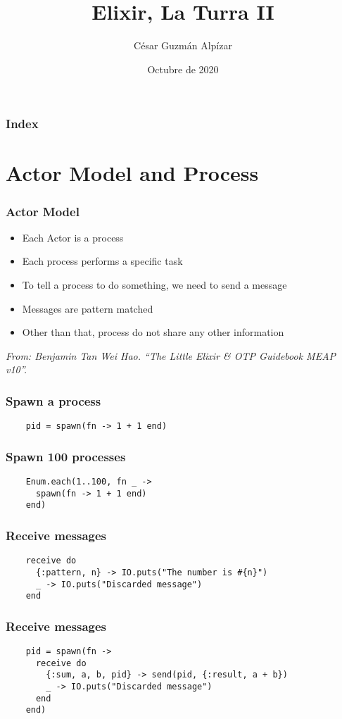\documentclass{beamer}
\title{Elixir, La Turra II}
\author{César Guzmán Alpízar}
\institute{Vipera Ibérica}
\date{Octubre de 2020}
\begin{document}
\frame{\titlepage}

\begin{frame}
  \frametitle{Index}
  \tableofcontents
\end{frame}

\section{Actor Model and Process}
\begin{frame}
  \frametitle{Actor Model}
  \begin{itemize}
    \item Each Actor is a process
    \item Each process performs a specific task
    \item To tell a process to do something, we need to send a message
    \item Messages are pattern matched
    \item Other than that, process do not share any other information
  \end{itemize}
  \begin{center}
    \textit{From: Benjamin Tan Wei Hao. “The Little Elixir \& OTP Guidebook MEAP v10”.}
  \end{center}
\end{frame}

\begin{frame}[fragile]
  \frametitle{Spawn a process}
  \begin{verbatim}
    pid = spawn(fn -> 1 + 1 end)
  \end{verbatim}
\end{frame}

\begin{frame}[fragile]
  \frametitle{Spawn 100 processes}
  \begin{verbatim}
    Enum.each(1..100, fn _ ->
      spawn(fn -> 1 + 1 end)
    end)
  \end{verbatim}
\end{frame}

\begin{frame}[fragile]
  \frametitle{Receive messages}
  \begin{verbatim}
    receive do
      {:pattern, n} -> IO.puts("The number is #{n}")
      _ -> IO.puts("Discarded message")
    end
  \end{verbatim}
\end{frame}

\begin{frame}[fragile]
  \frametitle{Receive messages}
  \begin{verbatim}
    pid = spawn(fn ->
      receive do
        {:sum, a, b, pid} -> send(pid, {:result, a + b})
        _ -> IO.puts("Discarded message")
      end
    end)
  \end{verbatim}
\end{frame}
\end{document}
